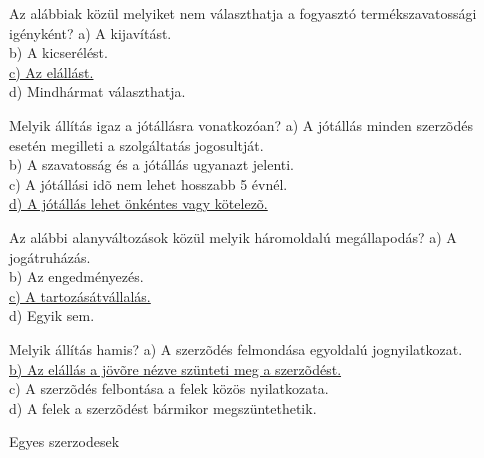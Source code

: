 \begin{frame}

\begin{tcolorbox}[title={164. Kérdés}]
Az alábbiak közül melyiket nem választhatja a fogyasztó termékszavatossági igényként?
\tcblower
a) A kijavítást.\\
b) A kicserélést.\\
\uline {c) Az elállást.}\\
d) Mindhármat választhatja.
\end{tcolorbox}

\begin{tcolorbox}[title={165. Kérdés}]
Melyik állítás igaz a jótállásra vonatkozóan?
\tcblower
a) A jótállás minden szerzõdés esetén megilleti a szolgáltatás jogosultját.\\
b) A szavatosság és a jótállás ugyanazt jelenti.\\
c) A jótállási idõ nem lehet hosszabb 5 évnél.\\
\uline {d) A jótállás lehet önkéntes vagy kötelezõ.}
\end{tcolorbox}

\begin{tcolorbox}[title={166. Kérdés}]
Az alábbi alanyváltozások közül melyik háromoldalú megállapodás?
\tcblower
a) A jogátruházás.\\
b) Az engedményezés.\\
\uline {c) A tartozásátvállalás.}\\
d) Egyik sem.
\end{tcolorbox}

\begin{tcolorbox}[title={167. Kérdés}]
Melyik állítás hamis?
\tcblower
a) A szerzõdés felmondása egyoldalú jognyilatkozat.\\
\uline {b) Az elállás a jövõre nézve szünteti meg a szerzõdést.}\\
c) A szerzõdés felbontása a felek közös nyilatkozata.\\
d) A felek a szerzõdést bármikor megszüntethetik.
\end{tcolorbox}

\end{frame}

\begin{frame}[plain]
\begin{tcolorbox}[center, colback={myyellow}, coltext={black}, colframe={myyellow}]
    { Egyes szerzodesek}\\
\end{tcolorbox}
\end{frame}

